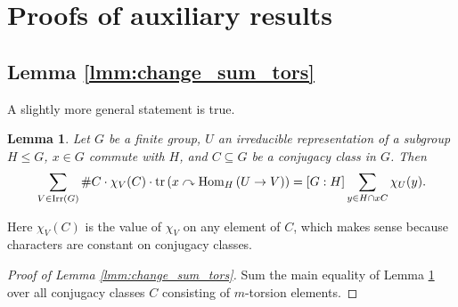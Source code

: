 \documentclass{amsart}
\newtheorem{lemma}[conjecture]{Lemma}
\newcommand{\Hom}[3][]{\tn{Hom}_{#1}\left(#2\to #3\right)}
\newcommand{\tn}{\textnormal}
\newcommand{\tr}{\operatorname{tr}}
\begin{document}
\section{Proofs of auxiliary results}

\subsection{Lemma \ref{lmm:change_sum_tors}}\label{ssec:pf_change_sum_tors}

A slightly more general statement is true.
\begin{lemma}\label{lmm:change_sum_irreps}
Let $G$ be a finite group, $U$ an irreducible representation of a subgroup $H\leq G$, $x\in G$ commute with $H$, and $C\subseteq G$ be a conjugacy class in $G$. Then
\begin{equation*}
\sum_{V\in\tn{Irr}(G)}\#C\cdot\chi_V(C)\cdot\tr\left(x\curvearrowright\Hom[H]{U}{V}\right)=[G:H]\sum_{y\in H\cap xC}\chi_U(y).
\end{equation*}
\end{lemma}
Here $\chi_V(C)$ is the value of $\chi_V$ on any element of $C$, which makes sense because characters are constant on conjugacy classes.
\begin{proof}[Proof of Lemma \ref{lmm:change_sum_tors}]
Sum the main equality of Lemma \ref{lmm:change_sum_irreps} over all conjugacy classes $C$ consisting of $m$-torsion elements.
\end{proof}
\end{document}
